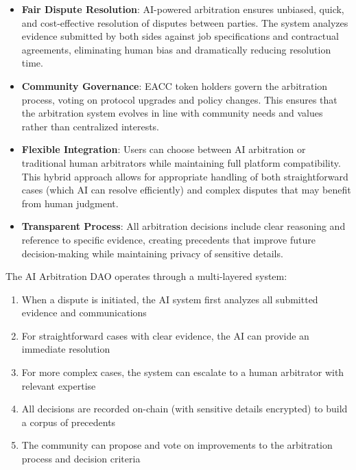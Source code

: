 \documentclass{article}
\begin{document}
\begin{itemize}
    \item \textbf{Fair Dispute Resolution}: AI-powered arbitration ensures unbiased, quick, and cost-effective resolution of disputes between parties. The system analyzes evidence submitted by both sides against job specifications and contractual agreements, eliminating human bias and dramatically reducing resolution time.
    
    \item \textbf{Community Governance}: EACC token holders govern the arbitration process, voting on protocol upgrades and policy changes. This ensures that the arbitration system evolves in line with community needs and values rather than centralized interests.
    
    \item \textbf{Flexible Integration}: Users can choose between AI arbitration or traditional human arbitrators while maintaining full platform compatibility. This hybrid approach allows for appropriate handling of both straightforward cases (which AI can resolve efficiently) and complex disputes that may benefit from human judgment.
    
    \item \textbf{Transparent Process}: All arbitration decisions include clear reasoning and reference to specific evidence, creating precedents that improve future decision-making while maintaining privacy of sensitive details.
\end{itemize}

The AI Arbitration DAO operates through a multi-layered system:

\begin{enumerate}
    \item When a dispute is initiated, the AI system first analyzes all submitted evidence and communications
    
    \item For straightforward cases with clear evidence, the AI can provide an immediate resolution
    
    \item For more complex cases, the system can escalate to a human arbitrator with relevant expertise
    
    \item All decisions are recorded on-chain (with sensitive details encrypted) to build a corpus of precedents
    
    \item The community can propose and vote on improvements to the arbitration process and decision criteria
\end{enumerate}
\end{document}
